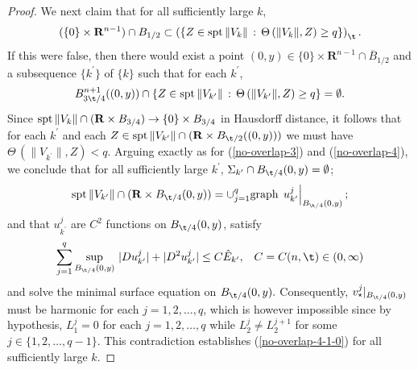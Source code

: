 \documentclass[a4paper,11pt]{amsart}
\begin{document}
\begin{proof}
We next claim that for all sufficiently large $k$,
\begin{equation}\label{no-overlap-4-1-0}
(\{0\} \times {\mathbf R}^{n-1}) \cap B_{1/2}  \subset \left(\{Z  \in {\rm spt} \, \|V_{k}\|\, : \, 
\Theta \, (\|V_{k}\|, Z) \geq q\}\right)_{\t}.
\end{equation}
If this were false, then there would exist a point $(0, y) \in \{0\} \times {\mathbf R}^{n-1} \cap {\overline B}_{1/2}$ and a subsequence $\{k^{\prime}\}$ of $\{k\}$ such that for each $k^{\prime}$, 
$$B^{n+1}_{3\t/4}((0, y)) \cap \{Z  \in {\rm spt} \, \|V_{k^{\prime}}\|\, : \, 
\Theta \, (\|V_{k^{\prime}}\|, Z) \geq q\} = \emptyset.$$
Since ${\rm spt} \, \|V_{k}\| \cap ({\mathbf R} \times B_{3/4}) \to \{0\} \times B_{3/4}$ in Hausdorff distance, it follows that for each $k^{\prime}$ and each 
$Z \in {\rm spt} \, \|V_{k^{\prime}}\| \cap ({\mathbf R} \times B_{\t/2}((0, y)))$ we must have 
$\Theta \, (\|V_{k^{\prime}}\|, Z) < q$. Arguing exactly as for (\ref{no-overlap-3}) and (\ref{no-overlap-4}), we conclude that for all sufficiently large $k^{\prime}$, $\Sigma_{k^{\prime}} \cap B_{\t/4}(0, y) = \emptyset$;
$${\rm spt} \, \|V_{k^{\prime}}\| \cap ({\mathbf R} \times B_{\t/4}(0, y)) = 
\cup_{j=1}^{q} {\rm graph} \, \left.u_{k^{\prime}}^{j}\right|_{B_{\t/4}(0, y)};$$ 
and that $u_{k^{\prime}}^{j}$ are $C^{2}$ functions on $B_{\t/4}(0, y)$, satisfy 
$$\sum_{j=1}^{q} \sup_{B_{\t/4}(0, y)} \, |Du_{k^{\prime}}^{j}| + |D^{2}u_{k^{\prime}}^{j}| \leq C{\hat E}_{k^{\prime}}, \;\;\; C = C(n, \t) \in (0, \infty)$$ 
and solve the minimal surface equation on $B_{\t/4}(0, y).$ Consequently, 
$v_{\star}^{j}|_{B_{\t/4}(0,y)}$ must be harmonic for each $j = 1, 2, \ldots, q$, which is however impossible since by hypothesis, 
$L_{1}^{j} = 0$ for each $j = 1, 2, \ldots, q$ while $L_{2}^{j} \neq L_{2}^{j+1}$ for some $j \in \{1, 2, \ldots, q-1\}.$ This contradiction establishes (\ref{no-overlap-4-1-0}) for all sufficiently large $k$.



\end{proof}
\end{document}
